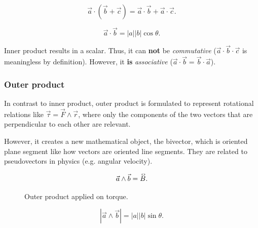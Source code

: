 \[
    \vec{a} \cdot ( \vec{b} + \vec{c} ) = \vec{a}\cdot\vec{b} + \vec{a}\cdot\vec{c}
.\]

\begin{definition}
    \[
        \vec{a} \cdot \vec{b} = |a| |b| \cos\theta
    .\]
\end{definition}

\begin{note}
    Inner product results in a scalar. Thus, it can \textbf{not} be \textit{commutative} ($\vec{a}\cdot \vec{b}\cdot \vec{c}$ is meaningless by definition). However, it \textbf{is} \textit{associative} ($\vec{a}\cdot \vec{b}=\vec{b}\cdot \vec{a}$).
\end{note}

\subsubsection{Outer product}%
\label{ssub:vector-outer-product}

In contrast to inner product, outer product is formulated to represent rotational relations like $\vec{\tau} = \vec{F} \wedge \vec{r}$, where only the components of the two vectors that are perpendicular to each other are relevant.

However, it creates a new mathematical object, the bivector, which is oriented plane segment like how vectors are oriented line segments. They are related to pseudovectors in physics (e.g. angular velocity).

\[
    \vec{a}\wedge \vec{b}=\bivec{B}
.\]

\begin{figure}[htpb]
\begin{center}
\end{center}
\caption{Outer product applied on torque.}%
\label{fig:torque-outer-product}
\end{figure}

\begin{definition}
    \[
        |\vec{a} \wedge \vec{b}| = |a| |b| \sin\theta
    .\]
\end{definition}

